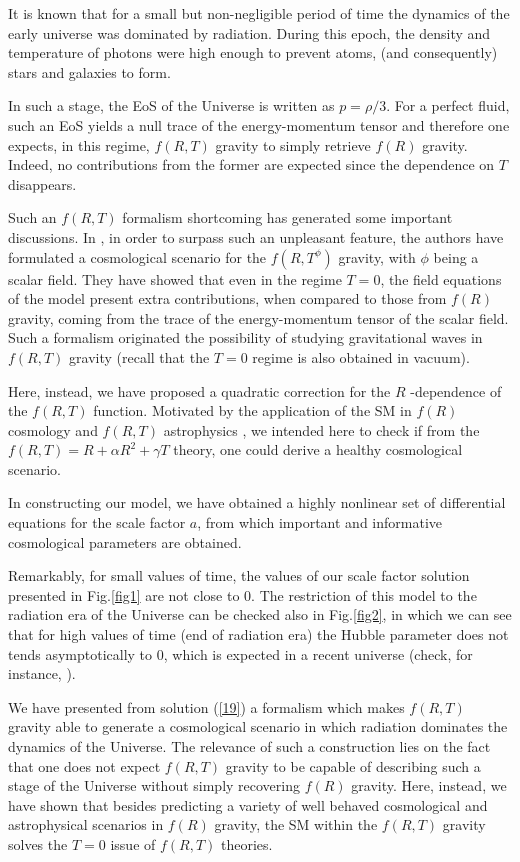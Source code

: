 It is known that for a small but non-negligible period of time the dynamics of the early universe
was dominated by radiation. During this epoch, the density and temperature
of photons were high enough to prevent atoms, (and consequently) stars and
galaxies to form.

In such a stage, the EoS of the Universe is written as $p=\rho/3$. For a
perfect fluid, such an EoS yields a null trace of the energy-momentum tensor
and therefore one expects, in this regime, $f(R,T)$ gravity to simply
retrieve $f(R)$ gravity. Indeed, no contributions from the former are
expected since the dependence on $T$ disappears.

Such an $f(R,T)$ formalism shortcoming has generated some important
discussions. In \cite{ms/2016}, in order to surpass such an unpleasant
feature, the authors have formulated a cosmological scenario for the $%
f(R,T^{\phi})$ gravity, with $\phi$ being a scalar field. They have showed
that even in the regime $T=0$, the field equations of the model present
extra contributions, when compared to those from $f(R)$ gravity, coming from
the trace of the energy-momentum tensor of the scalar field. Such a
formalism originated the possibility of studying gravitational waves in $%
f(R,T)$ gravity \cite{amam/2016} (recall that the $T=0$ regime is also
obtained in vacuum).

Here, instead, we have proposed a quadratic correction for the $R$%
-dependence of the $f(R,T)$ function. Motivated by the application of the SM
in $f(R)$ cosmology \cite%
{starobinsky/2007,goswami/2013,nojiri/2015,abebe/2016} and $f(R,T)$
astrophysics \cite{zubair/2015,noureen/2015,noureen/2015b}, we intended here
to check if from the $f(R,T)=R+\alpha R^{2}+\gamma T$ theory, one could
derive a healthy cosmological scenario.

In constructing our model, we have obtained a highly nonlinear set of
differential equations for the scale factor $a$, from which important
and informative cosmological parameters are obtained. 

Remarkably, for small values of time, the values of our scale factor
solution presented in Fig.\ref{fig1} are not close to $0$. The restriction of this model
to the radiation era of the Universe can be checked also in Fig.\ref{fig2},
in which we can see that for high values of time (end of radiation era) the
Hubble parameter does not tends asymptotically to $0$, which is expected in
a recent universe (check, for instance, \cite{ms/2016}).

We have presented from solution (\ref{19}) a formalism which makes $f(R,T)$ gravity able to
generate a cosmological scenario in which radiation dominates the dynamics
of the Universe. The relevance of such a construction lies on the fact that
one does not expect $f(R,T)$ gravity to be capable of describing such a
stage of the Universe without simply recovering $f(R)$ gravity. Here,
instead, we have shown that besides predicting a variety of well behaved
cosmological and astrophysical scenarios in $f(R)$ gravity, the SM within
the $f(R,T)$ gravity solves the $T=0$ issue of $f(R,T)$ theories.

